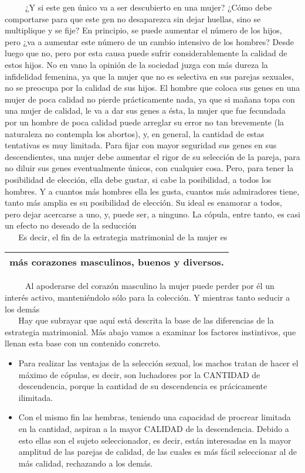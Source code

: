 ~ ~ ~ ¿Y si este gen único va a ser descubierto en una mujer? ¿Cómo debe
comportarse para que este gen no desaparezca sin dejar huellas, sino se
multiplique y se fije? En principio, se puede aumentar el número de los
hijos, pero ¿va a aumentar este número de un cambio intensivo de los
hombres? Desde luego que no, pero por esta causa puede sufrir
considerablemente la calidad de estos hijos. No en vano la opinión de la
sociedad juzga con más dureza la infidelidad femenina, ya que la mujer
que no es selectiva en sus parejas sexuales, no se preocupa por la
calidad de sus hijos. El hombre que coloca sus genes en una mujer de
poca calidad no pierde prácticamente nada, ya que si mañana topa con una
mujer de calidad, le va a dar sus genes a ésta, la mujer que fue
fecundada por un hombre de poca calidad puede arreglar su error no tan
brevemente (la naturaleza no contempla los abortos), y, en general, la
cantidad de estas tentativas es muy limitada. Para fijar con mayor
seguridad sus genes en sus descendientes, una mujer debe aumentar el
rigor de su selección de la pareja, para no diluir sus genes
eventualmente únicos, con cualquier cosa. Pero, para tener la
posibilidad de elección, ella debe gustar, si cabe la posibilidad, a
todos los hombres. Y a cuantos más hombres ella les gusta, cuantos más
admiradores tiene, tanto más amplia es su posibilidad de elección. Su
ideal es enamorar a todos, pero dejar acercarse a uno, y, puede ser, a
ninguno. La cópula, entre tanto, es casi un efecto no deseado de la
seducción\\
\hspace*{0.333em} ~ ~ Es decir, el fin de la estrategia matrimonial de
la mujer es

\begin{longtable}[]{@{}l@{}}
\toprule
más corazones masculinos, buenos y diversos.\tabularnewline
\bottomrule
\end{longtable}

~ ~ ~ Al apoderarse del corazón masculino la mujer puede perder por él
un interés activo, manteniéndolo sólo para la colección. Y mientras
tanto seducir a los demás\\
\hspace*{0.333em} ~ ~ Hay que subrayar que aquí está descrita la base de
las diferencias de la estrategia matrimonial. Más abajo vamos a examinar
los factores instintivos, que llenan esta base con un contenido
concreto.

\begin{itemize}
\tightlist
\item
  Para realizar las ventajas de la selección sexual, los machos tratan
  de hacer el máximo de cópulas, es decir, son luchadores por la
  CANTIDAD de descendencia, porque la cantidad de su descendencia es
  prácicamente ilimitada.
\item
  Con el mismo fin las hembras, teniendo una capacidad de procrear
  limitada en la cantidad, aspiran a la mayor CALIDAD de la
  descendencia. Debido a esto ellas son el sujeto seleccionador, es
  decir, están interesadas en la mayor amplitud de las parejas de
  calidad, de las cuales es más fácil seleccionar al de más calidad,
  rechazando a los demás.
\end{itemize}

